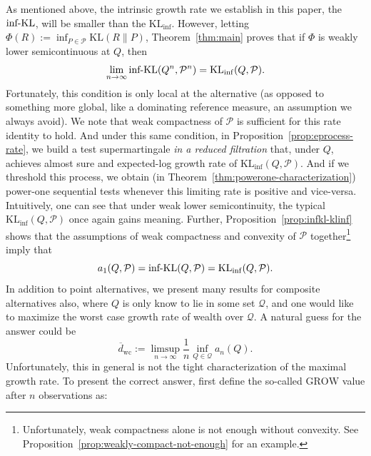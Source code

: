 \documentclass[11pt]{article}
\newcommand{\KL}{\mathrm{KL}}
\newcommand{\KLinf}{\mathrm{KL}_{\mathrm{inf}}}
\newcommand{\infKL}{\textnormal{inf-KL}}
\newcommand{\Pcal}{\mathcal{P}}
\newcommand{\Qcal}{\mathcal{Q}}
\newcommand{\bPn}{(\mathcal{P}^n)^{\circ\circ}}
\theoremstyle{definition}
\theoremstyle{definition}
\begin{document}
As mentioned above, the intrinsic growth rate we establish in this paper, the $\infKL$, will be smaller than the $\KLinf$. However, letting $\Phi(R):=\inf_{P\in\Pcal}\KL(R\|P)$, Theorem~\ref{thm:main} proves that if $\Phi$ is weakly lower semicontinuous at $Q$, then
\[
\lim_{n\to\infty} \infKL(Q^n,\Pcal^n) =\KLinf(Q,\Pcal).
\]
Fortunately, this condition is only local at the alternative (as opposed to something more global, like a dominating reference measure, an assumption we always avoid). We note that weak compactness of $\Pcal$ is sufficient for this rate identity to hold. And under this same condition, in Proposition~\ref{prop:eprocess-rate}, we build a test supermartingale \emph{in a reduced filtration} that, under $Q$, achieves almost sure and expected-log growth rate of $\KLinf(Q,\Pcal)$. And if we threshold this process, we obtain (in Theorem~\ref{thm:powerone-characterization}) power-one sequential tests whenever this limiting rate is positive and vice-versa. Intuitively, one can see that under weak lower semicontinuity, the typical $\KLinf(Q,\Pcal)$ once again gains meaning. 
Further,  Proposition~\ref{prop:infkl-klinf} shows that the assumptions of weak compactness and convexity of $\Pcal$ together\footnote{Unfortunately, weak compactness alone is not enough without convexity. See Proposition~\ref{prop:weakly-compact-not-enough} for an example.} imply that
\[
a_1(Q,\Pcal)= \infKL(Q,\Pcal)=\KLinf(Q,\Pcal).
\]
In addition to point alternatives, we present many results for composite alternatives also, where $Q$ is only know to lie in some set $\Qcal$, and one would like to maximize the worst case growth rate of wealth over $\Qcal$. 
A natural guess for the answer could be
\[
\overline d_{\mathrm{wc}}:=\limsup_{n\to\infty}\frac1n \inf_{Q\in\Qcal} a_n(Q).
\]
Unfortunately, this in general is not the tight characterization of the maximal growth rate. To present the correct answer, first define the so-called $\mathrm{GROW}$ value \parencite{grunwald2024, arnold2026optimalevaluestestingmean} after $n$ observations as:
\end{document}
